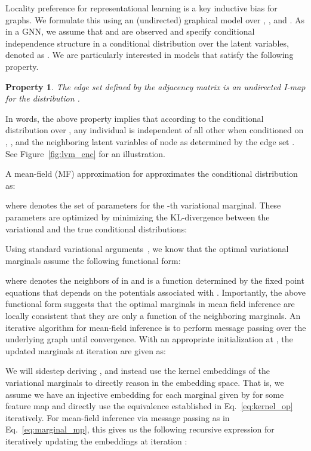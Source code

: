 \documentclass{article}
\newtheorem{property}[theorem]{Property}
\begin{document}
Locality preference for representational learning is a key inductive bias for graphs. We formulate this using an (undirected) graphical model  over ,  , and .
As in a GNN, we assume that  and  are observed and specify conditional independence structure in 
a
conditional distribution over the latent variables, denoted as . We are particularly interested in models that satisfy the following property.
\begin{property}\label{thm:imap}
The edge set  defined by the adjacency matrix   is an undirected I-map for the 
distribution .
\end{property}

In words, the above property implies that according to the conditional distribution over , any individual   is independent of all other  
when conditioned on , , and the neighboring latent variables of node  as determined by the edge set . See Figure~\ref{fig:lvm_enc} for an illustration. 

A mean-field (MF) approximation for   approximates the conditional distribution   as:

where  denotes the set of parameters for the -th variational 
marginal.
These parameters are optimized by minimizing the KL-divergence between the variational 
and the true 
conditional distributions:


Using standard variational arguments~\citep{wainwright2008graphical}, we know that the optimal variational marginals  assume the following functional form:

where  denotes the neighbors of  in  
and  is a function determined by the fixed point equations that depends on the potentials associated with . 
Importantly, the above functional form suggests that the optimal marginals in mean field inference are locally consistent that they are only a function of the neighboring marginals.
An iterative algorithm for mean-field inference is to perform message passing over the underlying graph until convergence. With an appropriate initialization at , the updated marginals at iteration  are given as:


We will sidestep deriving , and instead use the kernel embeddings of the variational marginals to directly reason in the embedding space. 
That is, we assume we have an injective embedding for each marginal  given by  for some feature map  
and directly use the equivalence established in Eq.~\eqref{eq:kernel_op} iteratively. For mean-field inference via message passing as in Eq.~\eqref{eq:marginal_mp}, this gives us the following recursive expression for iteratively updating the embeddings at iteration :
\end{document}
